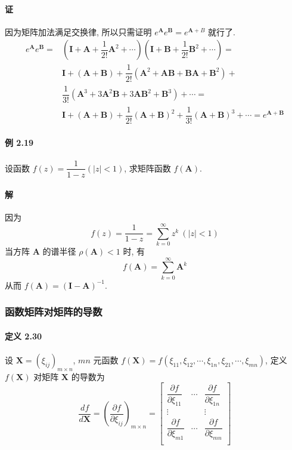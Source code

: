 \paragraph*{证} 因为矩阵加法满足交换律, 所以只需证明 $e^{\bm{A}}e^{\bm{B}} = e^{\bm{A} + B}$ 就行了.
\begin{align*}
    e^{\bm{A}}e^{\bm{B}} = & (\bm{I} + \bm{A} + \dfrac{1}{2!}\bm{A}^2 + \cdots)(\bm{I} + \bm{B} + \dfrac{1}{2!}\bm{B}^2 + \cdots) =                          \\
                           & \bm{I} + (\bm{A} + \bm{B}) + \dfrac{1}{2!}(\bm{A}^2 + \bm{AB} + \bm{BA} + \bm{B}^2) +                                           \\
                           & \dfrac{1}{3!}(\bm{A}^3 + 3\bm{A}^2\bm{B} + 3\bm{AB}^2 + \bm{B}^3) + \cdots =                                                    \\
                           & \bm{I} + (\bm{A} + \bm{B}) + \dfrac{1}{2!}(\bm{A} + \bm{B})^2 + \dfrac{1}{3!}(\bm{A} + \bm{B})^3 + \cdots = e^{\bm{A} + \bm{B}}
\end{align*}

\paragraph*{例 2.19} 设函数 $f(z) = \dfrac{1}{1 - z}(\lvert z \rvert < 1)$, 求矩阵函数 $f(\bm{A})$.

\paragraph*{解} 因为
$$
    f(z) = \dfrac{1}{1 - z} = \sum\limits_{k=0}^\infty z^k \ (\lvert z \rvert < 1)
$$
当方阵 $\bm{A}$ 的谱半径 $\rho(\bm{A}) < 1$ 时, 有
$$
    f(\bm{A}) = \sum\limits_{k = 0}^\infty \bm{A}^k
$$
从而 $f(\bm{A}) = (\bm{I} - \bm{A})^{-1}$.

\subsubsection{函数矩阵对矩阵的导数}

\paragraph*{定义 2.30} 设 $\bm{X} = (\xi_{ij})_{m\times n}$, $mn$ 元函数 $f(\bm{X}) = f(\xi_{11}, \xi_{12}, \cdots, \xi_{1n}, \xi_{21}, \cdots, \xi_{mn})$, 定义 $f(\bm{X})$ 对矩阵 $\bm{X}$ 的导数为
$$
    \dfrac{df}{d\bm{X}} = (\dfrac{\partial f}{\partial \xi_{ij}})_{m\times n} = \begin{bmatrix}
        \dfrac{\partial f}{\partial\xi_{11}} & \cdots & \dfrac{\partial f}{\partial \xi_{1n}} \\
        \vdots & & \vdots \\
        \dfrac{\partial f}{\partial\xi_{m1}} & \cdots & \dfrac{\partial f}{\partial \xi_{mn}} \\
    \end{bmatrix}
$$

